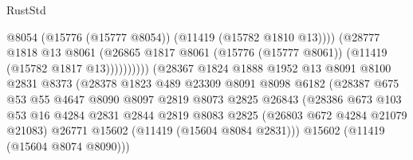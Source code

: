 \begin{lexlean}{RustStd}
\begin{coremodule}
                                              @8054
                                              (@15776 (@15777 @8054))
                                              (@11419 (@15782 @1810 @13))))
                                          (@28777
                                            @1818
                                            @13
                                            @8061
                                            (@26865
                                              @1817
                                              @8061
                                              (@15776 (@15777 @8061))
                                              (@11419 (@15782 @1817 @13))))))))))
                              (@28367
                                @1824
                                @1888
                                @1952
                                @13
                                @8091
                                @8100
                                @2831
                                @8373
                                (@28378
                                  @1823
                                  @489
                                  @23309
                                  @8091
                                  @8098
                                  @6182
                                  (@28387
                                    @675
                                    @53
                                    @55
                                    @4647
                                    @8090
                                    @8097
                                    @2819
                                    @8073
                                    @2825
                                    @26843
                                    (@28386
                                      @673
                                      @103
                                      @53
                                      @16
                                      @4284
                                      @2831
                                      @2844
                                      @2819
                                      @8083
                                      @2825
                                      (@26803 @672 @4284 @21079 @21083)
                                      @26771
                                      @15602
                                      (@11419 (@15604 @8084 @2831)))
                                    @15602
                                    (@11419 (@15604 @8074 @8090)))

\end{coremodule}
\end{lexlean}
